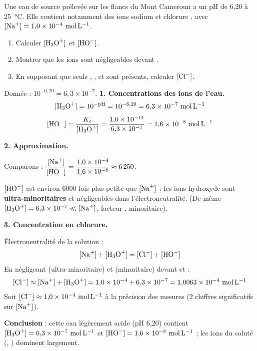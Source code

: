 \documentclass[11pt]{article}
\begin{document}
\begin{exoresolu}
Une eau de source prélevée sur les flancs du Mont Cameroun a un pH de 6,20 à \SI{25}{\celsius}. Elle contient notamment des ions sodium  et chlorure , avec $[\ce{Na+}] = 1{,}0 \times 10^{-4}\ \si{mol.L^{-1}}$.
\begin{enumerate}
\item Calculer $[\ce{H3O+}]$ et $[\ce{HO-}]$.
\item Montrer que les ions  sont négligeables devant .
\item En supposant que seuls , ,  et  sont présents, calculer $[\ce{Cl-}]$.
\end{enumerate}
Donnée : $10^{-6{,}20} = 6{,}3 \times 10^{-7}$.
\tcblower
\textbf{1. Concentrations des ions de l'eau.}
\[ [\ce{H3O+}] = 10^{-\text{pH}} = 10^{-6{,}20} = 6{,}3 \times 10^{-7}\ \si{mol.L^{-1}} \]
\[ [\ce{HO-}] = \frac{K_e}{[\ce{H3O+}]} = \frac{1{,}0 \times 10^{-14}}{6{,}3 \times 10^{-7}} = 1{,}6 \times 10^{-8}\ \si{mol.L^{-1}} \]

\textbf{2. Approximation.}

Comparons : $\dfrac{[\ce{Na+}]}{[\ce{HO-}]} = \dfrac{1{,}0 \times 10^{-4}}{1{,}6 \times 10^{-8}} \approx 6\,250$.

$[\ce{HO-}]$ est environ 6000 fois plus petite que $[\ce{Na+}]$ : les ions hydroxyde sont \textbf{ultra-minoritaires} et négligeables dans l'électroneutralité. (De même $[\ce{H3O+}] = 6{,}3 \times 10^{-7} \ll [\ce{Na+}]$, facteur , minoritaire).

\textbf{3. Concentration en chlorure.}

Électroneutralité de la solution :
\[ [\ce{Na+}] + [\ce{H3O+}] = [\ce{Cl-}] + [\ce{HO-}] \]
En négligeant  (ultra-minoritaire) et  (minoritaire) devant  et  :
\[ [\ce{Cl-}] \approx [\ce{Na+}] + [\ce{H3O+}] = 1{,}0 \times 10^{-4} + 6{,}3 \times 10^{-7} = 1{,}0063 \times 10^{-4}\ \si{mol.L^{-1}} \]
Soit $[\ce{Cl-}] \approx 1{,}0 \times 10^{-4}\ \si{mol.L^{-1}}$ à la précision des mesures (2 chiffres significatifs sur $[\ce{Na+}]$).

\textbf{Conclusion} : cette eau légèrement acide (pH 6,20) contient $[\ce{H3O+}] = 6{,}3 \times 10^{-7}\ \si{mol.L^{-1}}$ et $[\ce{HO-}] = 1{,}6 \times 10^{-8}\ \si{mol.L^{-1}}$ ; les ions du soluté (, ) dominent largement.
\end{exoresolu}
\end{document}
